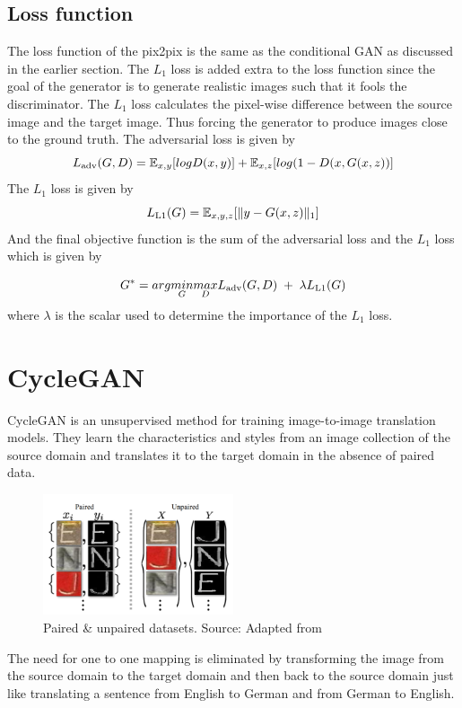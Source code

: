 \subsection{Loss function}
The loss function of the pix2pix is the same as the conditional GAN as discussed in the earlier section. The $L_1$ loss is added extra to the loss function since the goal of the generator is to generate realistic images such that it fools the discriminator. The $L_1$ loss calculates the pixel-wise difference between the source image and the target image. Thus forcing the generator to produce images close to the ground truth. The adversarial loss \citep{isola2017image} is given by
\begin{equation*}
L\textsubscript{adv}(G,D)=\mathbb{E}_{x,y}[log D(x,y)] + \mathbb{E}_{x,z}[log(1-D(x,G(x,z))]
\end{equation*}
The $L_1$ loss \citep{isola2017image} is given  by 
\begin{equation*}
L\textsubscript{L1}(G)=\mathbb{E}_{x,y,z}[\lVert y - G(x,z) \rVert_1]
\end{equation*}
And the final objective function \citep{isola2017image} is the sum of the adversarial loss and the $L_1$ loss which is given  by

\begin{equation*}
G^*=arg\underset{G}{min}\underset{D}{max}L\textsubscript{adv}(G,D)\; + \;\lambda L\textsubscript{L1}(G)
\end{equation*}
\noindent
where $\lambda$ is the scalar used to determine the importance of the $L_1$ loss.

\section{CycleGAN}
CycleGAN is an unsupervised method for training image-to-image translation models. They learn the characteristics and styles from an image collection of the source domain and translates it to the target domain in the absence of paired data. \\
\begin{figure}
\centering
\includegraphics[width=0.5\textwidth]{images/newcyc.png}
\caption[Paired \& unpaired datasets]{Paired \& unpaired datasets. Source: Adapted from \citep{CycleGAN2017}}
\label{fig:pau}
\end{figure}
	The need for one to one mapping is eliminated by transforming the image from the source domain to the target domain and then back to the source domain just like translating a sentence from English to German and from German to English. 
\newline

